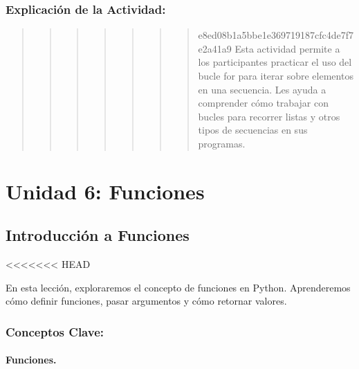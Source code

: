\documentclass[
  a4paper,
  DIV=11,
  numbers=noendperiod,
  onepage,
  openany]{scrreprt}
\begin{document}
\hypertarget{explicaciuxf3n-de-la-actividad-41}{%
\section{Explicación de la
Actividad:}\label{explicaciuxf3n-de-la-actividad-41}}

\begin{quote}
\begin{quote}
\begin{quote}
\begin{quote}
\begin{quote}
\begin{quote}
\begin{quote}
e8ed08b1a5bbe1e369719187cfc4de7f7e2a41a9 Esta actividad permite a los
participantes practicar el uso del bucle for para iterar sobre elementos
en una secuencia. Les ayuda a comprender cómo trabajar con bucles para
recorrer listas y otros tipos de secuencias en sus programas.
\end{quote}
\end{quote}
\end{quote}
\end{quote}
\end{quote}
\end{quote}
\end{quote}

\part{Unidad 6: Funciones}

\hypertarget{introducciuxf3n-a-funciones}{%
\chapter{Introducción a Funciones}\label{introducciuxf3n-a-funciones}}

\textless\textless\textless\textless\textless\textless\textless{} HEAD

En esta lección, exploraremos el concepto de funciones en Python.
Aprenderemos cómo definir funciones, pasar argumentos y cómo retornar
valores.

\hypertarget{conceptos-clave-44}{%
\section{Conceptos Clave:}\label{conceptos-clave-44}}

\hypertarget{funciones.}{%
\subsection{Funciones.}\label{funciones.}}
\end{document}
